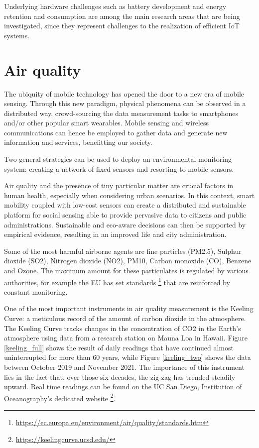 			Underlying hardware challenges such as battery development and energy retention and consumption are among the main research areas that are being investigated, since they represent challenges to the realization of efficient IoT systems.
				
	\section{Air quality}
	
		The ubiquity of mobile technology has opened the door to a new era of mobile sensing. 
		Through this new paradigm, physical phenomena can be observed in a distributed way, crowd-sourcing the data measurement tasks to smartphones and/or other popular smart wearables. Mobile sensing and wireless communications can hence be employed to gather data and generate new information and services, benefitting our society.
		
		Two general strategies can be used to deploy an environmental monitoring system: creating a network of fixed sensors	and resorting to mobile sensors.
			
		Air quality and the presence of tiny particular matter are crucial factors in human health, especially when considering urban scenarios. 
		In this context, smart mobility coupled with low-cost sensors can create a distributed and sustainable platform for social sensing able to provide pervasive data to citizens and public administrations. 
		Sustainable and eco-aware decisions can then be supported by empirical evidence, resulting in an improved life and city administration. 
		
		Some of the most harmful airborne agents are fine particles (PM2.5), Sulphur dioxide (SO2), Nitrogen dioxide (NO2), PM10, Carbon monoxide (CO), Benzene and Ozone.
		The maximum amount for these particulates is regulated by various authorities, for example the EU has set standards \footnote{\url{https://ec.europa.eu/environment/air/quality/standards.htm}} that are reinforced by constant monitoring.
				
		One of the most important instruments in air quality measurement is the Keeling Curve: a meticulous record of the amount of carbon dioxide in the atmosphere.
		The Keeling Curve tracks changes in the concentration of CO2 in the Earth's atmosphere using data from a research station on Mauna Loa in Hawaii.
		Figure \ref{keeling_full} shows the result of daily readings that have continued almost uninterrupted for more than 60 years, while Figure \ref{keeling_two} shows the data between October 2019 and November 2021.
		The importance of this instrument lies in the fact that, over those six decades, the zig-zag has trended steadily upward. 
		Real time readings can be found on the UC San Diego, Institution of Oceanography's dedicated website \footnote{\url{https://keelingcurve.ucsd.edu/}}.
	
